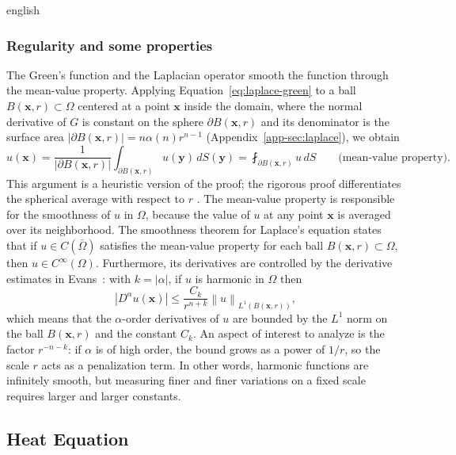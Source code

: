\documentclass[11pt,letterpaper,twoside,openright]{book} %
\newcommand{\norm}[1]{\left\lVert #1 \right\rVert}
\newcommand{\abs}[1]{\left\lvert #1 \right\rvert}
\begin{document}
\begin{hyphenrules}{english}
\subsubsection{Regularity and some properties}
The Green's function and the Laplacian operator smooth the function through the mean-value property.
Applying Equation~\eqref{eq:laplace-green} to a ball $B(\mathbf{x},r)\subset\Omega$ centered at a point $\mathbf{x}$
inside the domain, where the normal derivative of $G$ is constant on the sphere $\partial B(\mathbf{x},r)$ and
its denominator is the surface area $\abs{\partial B(\mathbf{x},r)}=n\alpha(n)r^{n-1}$
(Appendix~\ref{app-sec:laplace}), we obtain
\begin{equation}
  u(\mathbf{x})=\frac{1}{\abs{\partial B(\mathbf{x},r)}}\int_{\partial B(\mathbf{x},r)}u(\mathbf{y})\,d S(\mathbf{y})
  =\fint_{\partial B(\mathbf{x},r)}u\,d S \qquad\text{(mean-value property)}.
  \label{eq:mvp}
\end{equation}
This argument is a heuristic version of the proof; the rigorous proof differentiates the spherical
average with respect to $r$ \cite[Section 2.2.2]{evans2010}. The mean-value property is
responsible for the smoothness of $u$ in $\Omega$, because the value of $u$ at any point $\mathbf{x}$ is
averaged over its neighborhood. The smoothness theorem for Laplace's equation states that if
$u\in C(\bar\Omega)$ satisfies the mean-value property for each ball $B(\mathbf{x},r)\subset\Omega$, then
$u\in C^\infty(\Omega)$. Furthermore, its derivatives are controlled by the derivative estimates in
Evans~\cite{evans2010}: with $k=\abs{\alpha}$, if $u$ is harmonic in $\Omega$ then
\begin{equation}
  \abs{D^\alpha u(\mathbf{x})}\le\frac{C_k}{r^{n+k}}\norm{u}_{L^1(B(\mathbf{x},r))},
  \label{eq:harmonic-estimate}
\end{equation}
which means that the $\alpha$-order derivatives of $u$ are bounded by the $L^1$ norm on the ball
$B(\mathbf{x},r)$ and the constant $C_k$. An aspect of interest to analyze is the factor $r^{-n-k}$: if $\alpha$
is of high order, the bound grows as a power of $1/r$, so the scale $r$ acts as a penalization term.
In other words, harmonic functions are infinitely smooth, but measuring finer and finer variations on a
fixed scale requires larger and larger constants.

\subsection{Heat Equation}\label{subsec:heat}


\end{hyphenrules}
\end{document}
